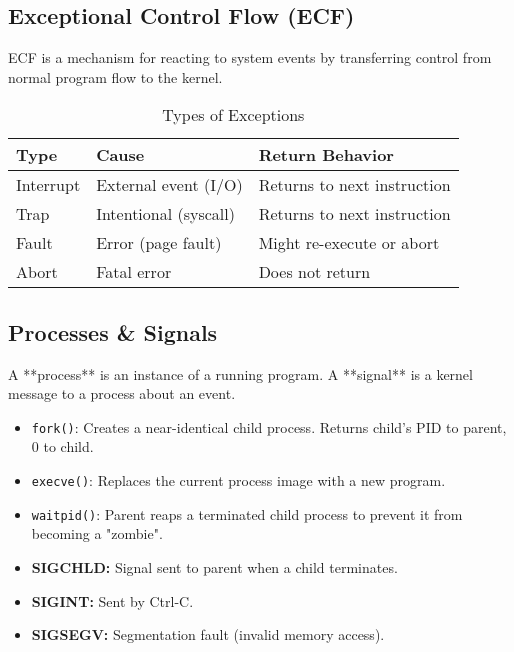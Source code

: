 \documentclass[10pt, twocolumn]{article}
\begin{document}
\subsection*{Exceptional Control Flow (ECF)}
ECF is a mechanism for reacting to system events by transferring control from normal program flow to the kernel.
\begin{table}[h]
    \centering
    \caption{Types of Exceptions}
    \scriptsize
    \begin{tabular}{lll}
        \toprule
        Type & Cause & Return Behavior \\
        \midrule
        Interrupt & External event (I/O) & Returns to next instruction \\
        Trap & Intentional (syscall) & Returns to next instruction \\
        Fault & Error (page fault) & Might re-execute or abort \\
        Abort & Fatal error & Does not return \\
        \bottomrule
    \end{tabular}
\end{table}

\subsection*{Processes \& Signals}
A **process** is an instance of a running program. A **signal** is a kernel message to a process about an event.
\begin{itemize}
    \item \texttt{fork()}: Creates a near-identical child process. Returns child's PID to parent, 0 to child.
    \item \texttt{execve()}: Replaces the current process image with a new program.
    \item \texttt{waitpid()}: Parent reaps a terminated child process to prevent it from becoming a "zombie".
    \item \textbf{SIGCHLD:} Signal sent to parent when a child terminates.
    \item \textbf{SIGINT:} Sent by Ctrl-C.
    \item \textbf{SIGSEGV:} Segmentation fault (invalid memory access).
\end{itemize}
\end{document}
